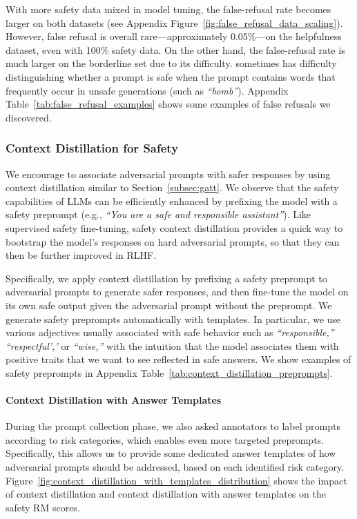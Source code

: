 With more safety data mixed in model tuning, the false-refusal rate becomes larger on both datasets (see Appendix Figure~\ref{fig:false_refusal_data_scaling}). However,  false refusal is overall rare---approximately 0.05\%---on the helpfulness dataset, even with 100\% safety data.
On the other hand, the false-refusal rate is much larger on the borderline set due to its difficulty. \modelname sometimes has difficulty distinguishing whether a prompt is safe when the prompt contains words that frequently occur in unsafe generations (such as \textit{``bomb''}). Appendix Table~\ref{tab:false_refusal_examples} shows some examples of false refusals we discovered. 


\subsubsection{Context Distillation for Safety}


We encourage \modelname to associate adversarial prompts with safer responses by using context distillation \citep{askell-etal-2021-general} similar to Section~\ref{subsec:gatt}.
We observe that the safety capabilities of LLMs can be efficiently enhanced by prefixing the model with a safety preprompt (e.g., \textit{``You are a safe and responsible assistant''}).
Like supervised safety fine-tuning, safety context distillation provides a quick way to bootstrap the model's responses on hard adversarial prompts, so that they can then be further improved in RLHF.

Specifically, we apply context distillation by prefixing a safety preprompt to adversarial prompts to generate safer responses, and then fine-tune the model on its own safe output given the adversarial prompt without the preprompt. 
We generate safety preprompts automatically with templates. In particular, we use various adjectives usually associated with safe behavior such as \textit{``responsible,''} \textit{``respectful','} or \textit{``wise,''} with the intuition that the model associates them with positive traits that we want to see reflected in safe answers. We show examples of safety preprompts in Appendix Table~\ref{tab:context_distillation_preprompts}.



\paragraph{Context Distillation with Answer Templates}
During the prompt collection phase, we also asked annotators to label prompts according to risk categories, which enables even more targeted preprompts. 
Specifically, this allows us to provide some dedicated answer templates of how adversarial prompts should be addressed, based on each identified risk category.
Figure~\ref{fig:context_distillation_with_templates_distribution} shows the impact of context distillation and context distillation with answer templates on the safety RM scores.

